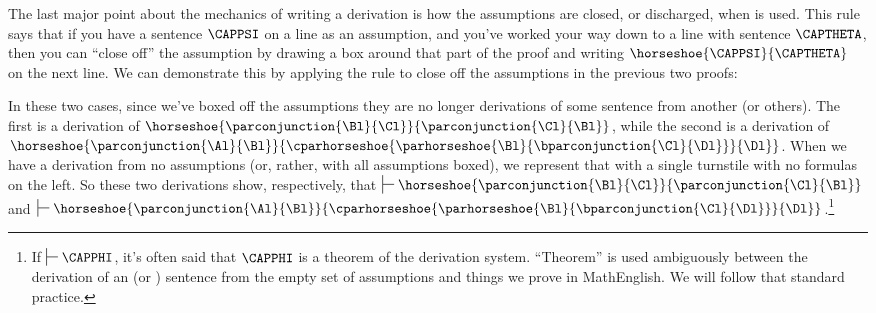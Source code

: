 The last major point about the mechanics of writing a derivation is how the assumptions are closed, or discharged, when  is used. This rule says that if you have a sentence $\CAPPSI$ on a line as an assumption, and you've worked your way down to a line with sentence $\CAPTHETA$, then you can ``close off'' the assumption by drawing a box around that part of the proof and writing $\horseshoe{\CAPPSI}{\CAPTHETA}$ on the next line. We can demonstrate this by applying the rule to close off the assumptions in the previous two proofs:
\begin{gproof}[\label{simpleconjunctionclosed}]
\end{gproof}
\begin{gproof}[\label{secondexamplefinished}]
\end{gproof}
\noindent{}In these two cases, since we've boxed off the assumptions they are no longer derivations of some sentence from another (or others). The first is a derivation of  $\horseshoe{\parconjunction{\Bl}{\Cl}}{\parconjunction{\Cl}{\Bl}}$, while the second is a derivation of $\horseshoe{\parconjunction{\Al}{\Bl}}{\cparhorseshoe{\parhorseshoe{\Bl}{\bparconjunction{\Cl}{\Dl}}}{\Dl}}$. When we have a derivation from no assumptions (or, rather, with all assumptions boxed), we represent that with a single turnstile with no formulas on the left. So these two derivations show, respectively, that $\sststile{}{}\horseshoe{\parconjunction{\Bl}{\Cl}}{\parconjunction{\Cl}{\Bl}}$ and $\sststile{}{}\horseshoe{\parconjunction{\Al}{\Bl}}{\cparhorseshoe{\parhorseshoe{\Bl}{\bparconjunction{\Cl}{\Dl}}}{\Dl}}$.\footnote{If  $\sststile{}{}\CAPPHI$, it's often said that $\CAPPHI$ is a theorem of the derivation system. ``Theorem'' is used ambiguously between the derivation of an \GSL  (or \GQL) sentence from the empty set of assumptions and things we prove in MathEnglish.  We will follow that standard practice.}

